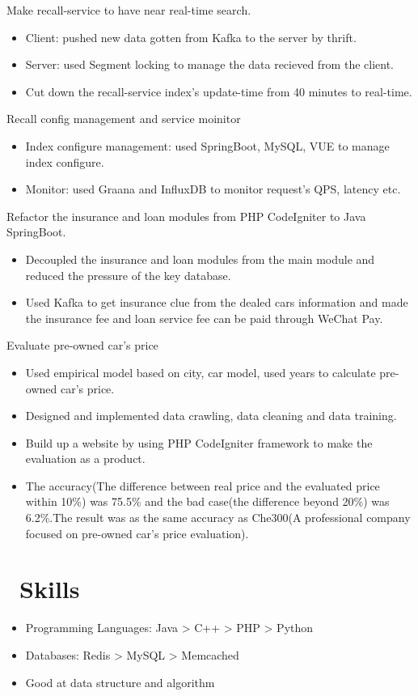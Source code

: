 \documentclass{resume}
\begin{document}
Make recall-service to have near real-time search.
\begin{itemize}
  \item Client: pushed new data gotten from Kafka to the server by thrift.
  \item Server: used Segment locking to manage the data recieved from the client. 
  \item Cut down the recall-service index's update-time from 40 minutes to real-time.
\end{itemize}

Recall config management and service moinitor
\begin{itemize}
  \item Index configure management: used SpringBoot, MySQL, VUE to manage index configure.
  \item Monitor: used Graana and InfluxDB to monitor request's QPS, latency etc.
\end{itemize}

Refactor the insurance and loan modules from PHP CodeIgniter to Java SpringBoot.
\begin{itemize}
  \item Decoupled the insurance and loan modules from the main module and reduced the pressure of the key database.
  \item Used Kafka to get insurance clue from the dealed cars information and made the insurance fee and loan service fee can be paid through WeChat Pay.
\end{itemize}

Evaluate pre-owned car's price
\begin{itemize}
  \item Used empirical model based on city, car model, used years to calculate pre-owned car's price.
  \item Designed and implemented data crawling, data cleaning and data training.
  \item Build up a website by using PHP CodeIgniter framework to make the evaluation as a product.
  \item The accuracy(The difference between real price and the evaluated price within 10\%) was 75.5\% and the bad case(the difference beyond 20\%) was 6.2\%.The result was as the same accuracy as Che300(A professional company focused on pre-owned car's price evaluation).
\end{itemize}

\section{\faCogs\ Skills}
\begin{itemize}[parsep=0.5ex]
  \item Programming Languages: Java > C++ > PHP > Python
  \item Databases: Redis > MySQL > Memcached
  \item Good at data structure and algorithm
\end{itemize}
\end{document}
